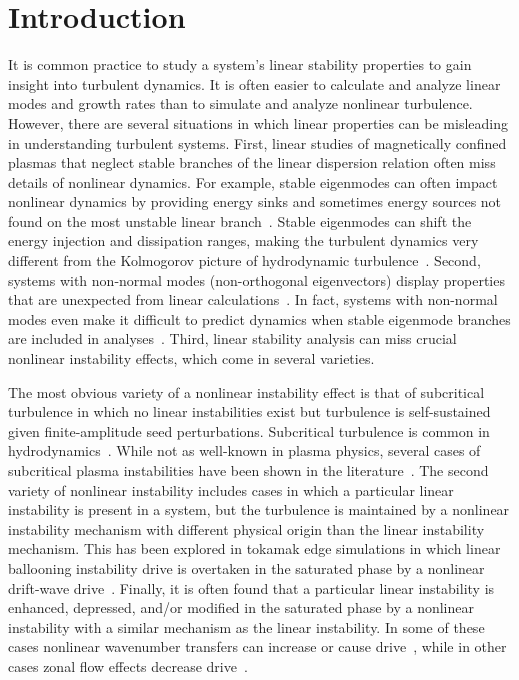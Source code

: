 \documentclass[showpacs,preprintnumbers,amsmath,amssymb,superscriptaddress]{revtex4}
\begin{document}
\section{Introduction}
It is common practice to study a system's linear stability properties to gain insight into turbulent dynamics. It is often easier to calculate and analyze linear modes and growth rates than
to simulate and analyze nonlinear turbulence. However, there are several situations in which linear properties can be misleading in understanding turbulent systems. First,
linear studies of magnetically confined plasmas that neglect stable branches of the linear dispersion relation often miss details of nonlinear dynamics. For example, stable eigenmodes can often
impact nonlinear dynamics by providing energy sinks and sometimes energy sources not found on the most unstable linear 
branch~\cite{baver2002,terry2002,terry2006a,terry2006b,gatto2006,terry2009,hatch2009,kim2010,makwana2011,hatch2011}. Stable eigenmodes can shift
the energy injection and dissipation ranges, making the turbulent dynamics very different from the Kolmogorov picture of hydrodynamic turbulence~\cite{Kolmogorov1941}.
Second, systems with non-normal modes (non-orthogonal eigenvectors) display properties that are unexpected from linear calculations~\cite{camargo1998}. 
In fact, systems with non-normal modes even make it difficult to predict dynamics
when stable eigenmode branches are included in analyses~\cite{kim2010}. Third, linear stability analysis can miss crucial nonlinear instability effects, which come in several varieties. 

The most obvious variety of a nonlinear instability effect is that of subcritical turbulence in which no linear instabilities exist but turbulence is self-sustained 
given finite-amplitude seed perturbations. Subcritical turbulence is
common in hydrodynamics~\cite{manneville2008}.  While not as well-known in plasma physics,
several cases of subcritical plasma instabilities have been shown in the
literature~\cite{scott1990,scott1992,drake1995,nordman1993,waltz1985,itoh1996,highcock2012}.
The second variety of nonlinear instability includes cases in which a particular linear instability is present in a system, but the turbulence is maintained
by a nonlinear instability mechanism with different physical origin
than the linear instability mechanism. This has been explored in tokamak edge simulations in which
linear ballooning instability drive is overtaken in the saturated phase by a nonlinear drift-wave drive~\cite{zeiler1996,zeiler1997,scott2002,scott2003,scott2005}.
Finally, it is often found that a particular linear instability is enhanced, depressed, and/or  modified in the saturated phase by a nonlinear instability with a similar mechanism 
as the linear instability. In some of these cases nonlinear wavenumber transfers can increase or cause drive~\cite{biskamp1995,korsholm1999}, while in other cases zonal flow effects
decrease drive~\cite{dimits2000,ernst2004}. 
\end{document}
